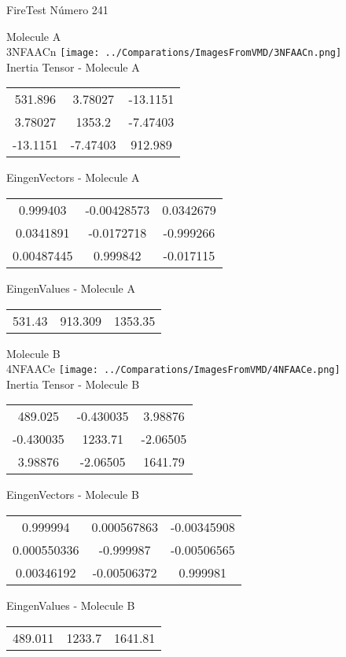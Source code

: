 \vtab[-2cm]
\begin{center}
{\large FireTest \tab Número 241}
\end{center}
\begin{multicols}{2}
\begin{center}

Molecule A \\ 
3NFAACn
\texttt{[image: ../Comparations/ImagesFromVMD/3NFAACn.png]}
\\
Inertia Tensor - Molecule A \\
\vtab

\begin{tabular}{|c c c|}
531.896	 & 	3.78027	 & 	-13.1151	 \\
3.78027	 & 	1353.2	 & 	-7.47403	 \\
-13.1151	 & 	-7.47403	 & 	912.989
\end{tabular}

\vtab
 EingenVectors - Molecule A     \\
\vtab
\begin{tabular}{|c c c|}
0.999403	 & 	-0.00428573	 & 	0.0342679	 \\
0.0341891	 & 	-0.0172718	 & 	-0.999266	 \\
0.00487445	 & 	0.999842	 & 	-0.017115
\end{tabular}

\vtab
 EingenValues - Molecule A     \\
\vtab
\begin{tabular}{|c c c|}
531.43	 & 	913.309	 & 	1353.35	 \\
\end{tabular}
\columnbreak

Molecule B \\ 
4NFAACe
\texttt{[image: ../Comparations/ImagesFromVMD/4NFAACe.png]}
\\
Inertia Tensor - Molecule B \\
\vtab

\begin{tabular}{|c c c|}
489.025	 & 	-0.430035	 & 	3.98876	 \\
-0.430035	 & 	1233.71	 & 	-2.06505	 \\
3.98876	 & 	-2.06505	 & 	1641.79
\end{tabular}

\vtab
 EingenVectors - Molecule B     \\
\vtab
\begin{tabular}{|c c c|}
0.999994	 & 	0.000567863	 & 	-0.00345908	 \\
0.000550336	 & 	-0.999987	 & 	-0.00506565	 \\
0.00346192	 & 	-0.00506372	 & 	0.999981
\end{tabular}

\vtab
 EingenValues - Molecule B     \\
\vtab
\begin{tabular}{|c c c|}
489.011	 & 	1233.7	 & 	1641.81	 \\
\end{tabular}

\end{center}
\end{multicols}
